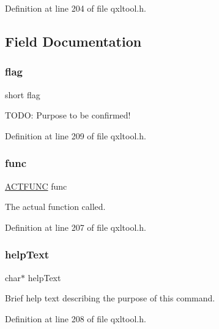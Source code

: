 Definition at line 204 of file qxltool.\+h.



\subsection{Field Documentation}
\mbox{\label{struct_j_t_b_l_a9872aee74ba489115d3dd6e1f29ca874}} 
\subsubsection{\texorpdfstring{flag}{flag}}
{\footnotesize\ttfamily short flag}

T\+O\+DO\+: Purpose to be confirmed! 

Definition at line 209 of file qxltool.\+h.

\mbox{\label{struct_j_t_b_l_ae6a382beea3f6271f4275fcda5612a65}} 
\subsubsection{\texorpdfstring{func}{func}}
{\footnotesize\ttfamily \hyperlink{qxltool_8h_a1aef0e7b7f81adb7442c3e9e8fc2d111}{A\+C\+T\+F\+U\+NC} func}

The actual function called. 

Definition at line 207 of file qxltool.\+h.

\mbox{\label{struct_j_t_b_l_ac1830353e983a2f22f664cd25d13edf7}} 
\subsubsection{\texorpdfstring{help\+Text}{helpText}}
{\footnotesize\ttfamily char$\ast$ help\+Text}

Brief help text describing the purpose of this command. 

Definition at line 208 of file qxltool.\+h.

\mbox{\label{struct_j_t_b_l_a5ac083a645d964373f022d03df4849c8}} 
